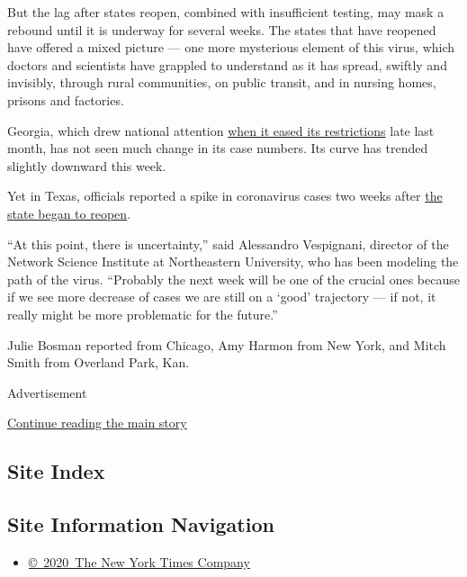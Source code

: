 But the lag after states reopen, combined with insufficient testing, may
mask a rebound until it is underway for several weeks. The states that
have reopened have offered a mixed picture --- one more mysterious
element of this virus, which doctors and scientists have grappled to
understand as it has spread, swiftly and invisibly, through rural
communities, on public transit, and in nursing homes, prisons and
factories.

Georgia, which drew national attention
\href{https://www.nytimes3xbfgragh.onion/2020/04/24/us/coronavirus-georgia-oklahoma-alaska-reopen.html}{when
it eased its restrictions} late last month, has not seen much change in
its case numbers. Its curve has trended slightly downward this week.

Yet in Texas, officials reported a spike in coronavirus cases two weeks
after
\href{https://www.nytimes3xbfgragh.onion/2020/05/01/us/coronavirus-texas-reopening.html}{the
state began to reopen}.

``At this point, there is uncertainty,'' said Alessandro Vespignani,
director of the Network Science Institute at Northeastern University,
who has been modeling the path of the virus. ``Probably the next week
will be one of the crucial ones because if we see more decrease of cases
we are still on a `good' trajectory --- if not, it really might be more
problematic for the future.''

Julie Bosman reported from Chicago, Amy Harmon from New York, and Mitch
Smith from Overland Park, Kan.

Advertisement

\protect\hyperlink{after-bottom}{Continue reading the main story}

\hypertarget{site-index}{%
\subsection{Site Index}\label{site-index}}

\hypertarget{site-information-navigation}{%
\subsection{Site Information
Navigation}\label{site-information-navigation}}

\begin{itemize}
\tightlist
\item
  \href{https://help.nytimes3xbfgragh.onion/hc/en-us/articles/115014792127-Copyright-notice}{©~2020~The
  New York Times Company}
\end{itemize}

